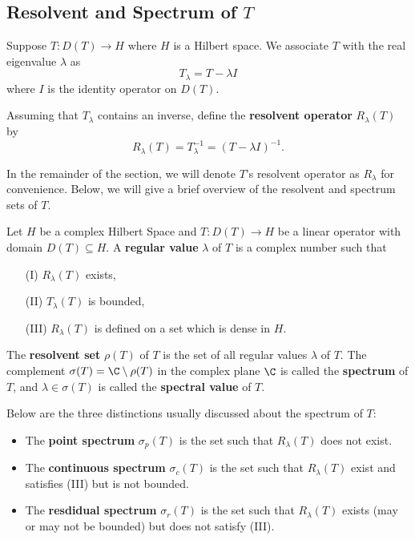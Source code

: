 \subsection{Resolvent and Spectrum of \( T  \)}

Suppose \( T: D(T) \to H  \) where \( H  \) is a Hilbert space. We associate \( T  \) with the real eigenvalue \( \lambda  \) as   
\[ {T}_{\lambda} = T - \lambda I  \]
where \( I  \) is the identity operator on \( D(T) \). 

\begin{definition}
    Assuming that \( {T}_{\lambda} \) contains an inverse, define the \textbf{resolvent operator} \( {R}_{\lambda}(T) \) by 
    \[  {R}_{\lambda}(T) = {T}_{\lambda}^{-1}  = (T - \lambda I )^{-1}. \]
\end{definition}

In the remainder of the section, we will denote \( T \)'s resolvent operator as \( {R}_{\lambda} \) for convenience. Below, we will give a brief overview of the resolvent and spectrum sets of \( T  \).

\begin{definition}
    Let \( H  \) be a complex Hilbert Space and \( T : D(T) \to H  \) be a linear operator with domain \( D(T) \subseteq  H \). A \textbf{regular value} \( \lambda  \) of \( T  \) is a complex number such that 
    \begin{enumerate}
        \item[(I)] \( {R}_{\lambda}(T) \) exists,
        \item[(II)] \( {T}_{\lambda}(T)  \) is bounded,
        \item[(III)] \( {R}_{\lambda}(T) \) is defined on a set which is dense in \( H  \).
    \end{enumerate}
    The \textbf{resolvent set} \( \rho(T) \) of \( T  \) is the set of all regular values \( \lambda  \) of \( T  \). The complement \( \sigma(T) = \C \setminus  \rho(T) \) in the complex plane \( \C  \) is called the \textbf{spectrum} of \( T  \), and \( \lambda \in \sigma(T) \) is called the \textbf{spectral value} of \( T  \).
\end{definition}

Below are the three distinctions usually discussed about the spectrum of \( T  \): 
\begin{itemize}
    \item The \textbf{point spectrum} \( \sigma_{p}(T) \) is the set such that \( {R}_{\lambda}(T) \) does not exist.
    \item The \textbf{continuous spectrum} \( {\sigma}_{c}(T) \) is the set such that \( {R}_{\lambda}(T)  \) exist and satisfies (III) but is not bounded.
    \item The \textbf{resdidual spectrum} \( {\sigma}_{r}(T) \) is the set such that \( {R}_{\lambda}(T) \) exists (may or may not be bounded) but does not satisfy (III).
\end{itemize}

